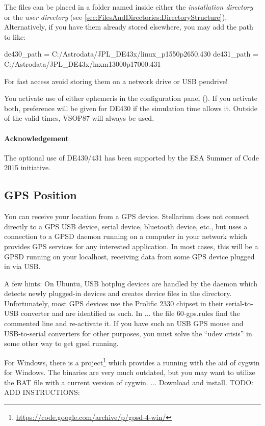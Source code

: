 The files can be placed in a folder named  inside either
the \emph{installation directory} or the \emph{user directory}
(see \ref{sec:FilesAndDirectories:DirectoryStructure}). Alternatively,
if you have them already stored elsewhere, you may add the path to
 like:

\begin{configfile}
[astro]
de430_path = C:/Astrodata/JPL_DE43x/linux_p1550p2650.430
de431_path = C:/Astrodata/JPL_DE43x/lnxm13000p17000.431
\end{configfile}

For fast access avoid storing them on a network drive or USB pendrive!

You activate use of either ephemeris in the configuration panel
(). If you activate both, preference will be given for DE430
if the simulation time allows it. Outside of the valid times, VSOP87
will always be used.

\paragraph{Acknowledgement}
The optional use of DE430/431 has been supported by the ESA Summer of
Code 2015 initiative.

\subsection{GPS Position}
\label{sec:ExtraData:GPSD}

You can receive your location from a GPS device. 
Stellarium does not connect directly to a GPS USB device, serial device, 
bluetooth device, etc., but uses a connection to a GPSD daemon running on a computer 
in your network which provides GPS services for any interested application. In most cases, 
this will be a GPSD running on your localhost, receiving data from some GPS device 
plugged in via USB.

A few hints: 
On Ubuntu, USB hotplug devices are handled by the  daemon which detects newly plugged-in 
devices and creates device files in the  directory. Unfortunately, most GPS devices use the Prolific 2330 
chipset in their serial-to-USB converter and are identified as such. In ... the file 60-gps.rules find the commented 
line and re-activate it. If you have such an USB GPS mouse and USB-to-serial converters for other purposes, you must solve 
the ``udev crisis'' in some other way to get gpsd running. 

For Windows, there is a project\footnote{\url{https://code.google.com/archive/p/gpsd-4-win/}} which provides a  
running with the aid of cygwin for Windows. The binaries are very much outdated, but you may want to utilize the BAT file with 
a current version of cygwin.
... Download and install. 
TODO: ADD INSTRUCTIONS:





